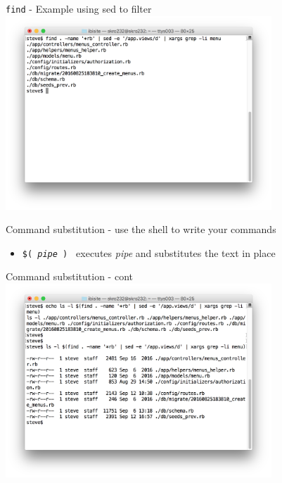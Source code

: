 \documentclass[t]{beamer}
\begin{document}
\begin{frame}{\texttt{find} - Example using sed to filter}
  \includegraphics[width=10cm,scale=0.4]{images/find-1.png}
  \note{}
\end{frame}

\begin{frame}{Command substitution - use the shell to write your commands}
  \begin{itemize}
  \item \texttt{\$( \textit{pipe} ) } executes \textit{pipe} and
    substitutes the text in place
  \end{itemize}
  \note{}
\end{frame}

\begin{frame}{Command substitution - cont}
  \includegraphics[width=10cm,scale=0.4]{images/cs-1.png}
  \note{}
\end{frame}
\end{document}
